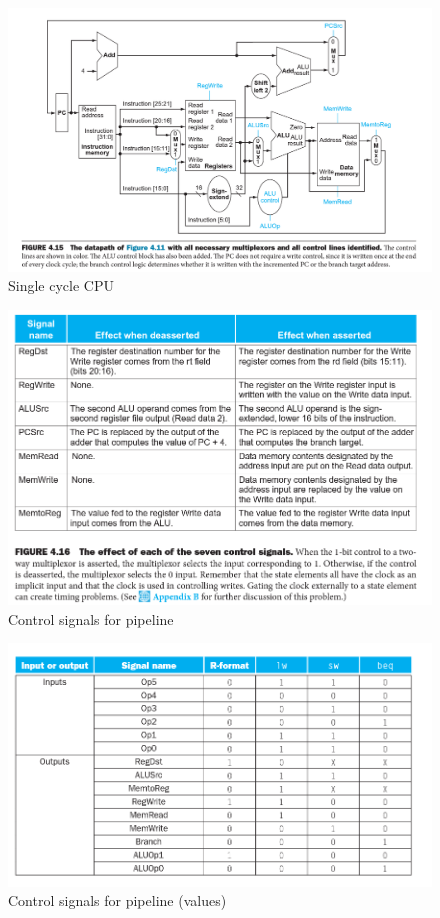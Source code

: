 \documentclass{scrartcl}
\begin{document}
\begin{figure}[h]
\centering
\includegraphics[scale=0.5]{Images/complete_path.png}
\caption{Single cycle CPU}
\end{figure}

\begin{figure}[h]
\centering
\includegraphics[scale=0.5]{Images/control_signals.png}
\caption{Control signals for pipeline}
\end{figure}

\begin{figure}[h]
\centering
\includegraphics[scale=0.5]{Images/control_summary.png}
\caption{Control signals for pipeline (values)}
\end{figure}
\end{document}
